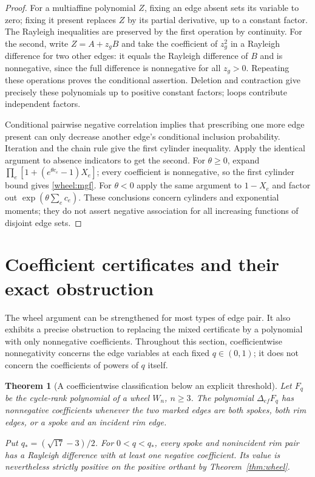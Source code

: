 \documentclass[11pt,a4paper]{article}
\newtheorem{theorem}{Theorem}[section]
\theoremstyle{definition}
\theoremstyle{remark}\newtheorem{remark}[theorem]{Remark}
\begin{document}
\begin{proof}
For a multiaffine polynomial $Z$, fixing an edge absent sets its
variable to zero; fixing it present replaces $Z$ by its partial
derivative, up to a constant factor. The Rayleigh inequalities are
preserved by the first operation by continuity. For the second, write
$Z=A+z_gB$ and take the coefficient of $z_g^2$ in a Rayleigh difference
for two other edges: it equals the Rayleigh difference of $B$ and is
nonnegative, since the full difference is nonnegative for all
$z_g>0$. Repeating these operations proves the conditional assertion.
Deletion and contraction give precisely these polynomials up to positive
constant factors; loops contribute independent factors.

Conditional pairwise negative correlation implies that prescribing
one more edge present can only decrease another edge's conditional
inclusion probability. Iteration and the chain rule give the first
cylinder inequality. Apply the identical argument to absence indicators
to get the second. For $\theta\ge0$, expand
$\prod_e[1+(e^{\theta c_e}-1)X_e]$; every coefficient is nonnegative,
so the first cylinder bound gives \eqref{wheel:mgf}. For $\theta<0$
apply the same argument to $1-X_e$ and factor out
$\exp(\theta\sum_e c_e)$. These conclusions concern cylinders and
exponential moments; they do not assert negative association for all
increasing functions of disjoint edge sets.
\end{proof}


\section{Coefficient certificates and their exact obstruction}
\label{sec:wheel-coefficients}

The wheel argument can be strengthened for most types of edge pair.
It also exhibits a precise obstruction to replacing the mixed certificate
by a polynomial with only nonnegative coefficients. Throughout this
section, coefficientwise nonnegativity concerns the edge variables at
each fixed $q\in(0,1)$; it does not concern the coefficients of powers of
$q$ itself.

\begin{theorem}[A coefficientwise classification below an explicit threshold]
\label{thm:wheel-coefficients}
Let $F_q$ be the cycle-rank polynomial of a wheel $W_n$, $n\ge3$.
The polynomial $\Delta_{ef}F_q$ has nonnegative coefficients whenever
the two marked edges are both spokes, both rim edges, or a spoke and an
incident rim edge.

Put $q_*=(\sqrt{17}-3)/2$. For $0<q<q_*$, every spoke and nonincident
rim pair has a Rayleigh difference with at least one negative
coefficient. Its value is nevertheless strictly positive on the
positive orthant by Theorem~\ref{thm:wheel}.
\end{theorem}
\end{document}
